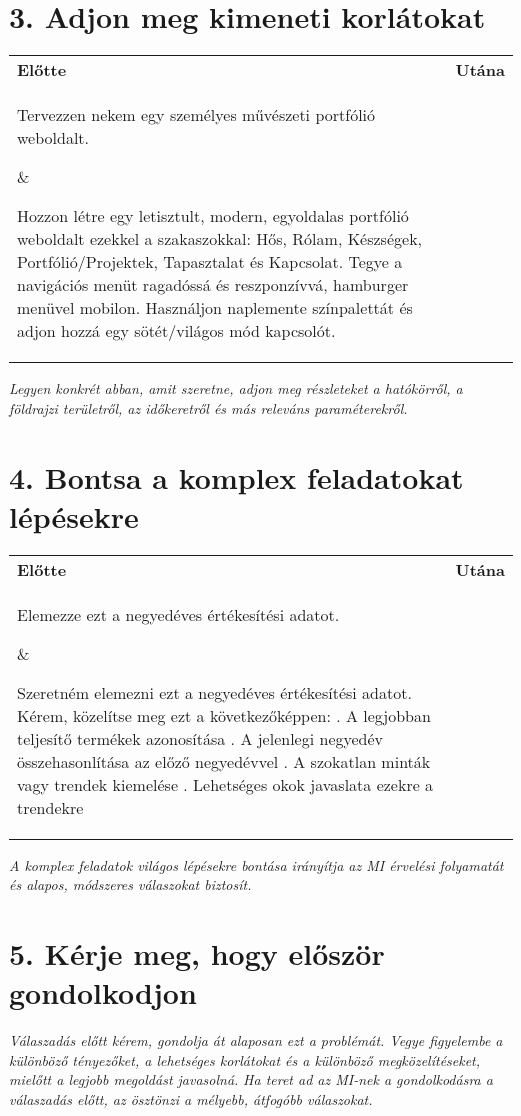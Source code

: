 \documentclass[a4paper, 12pt]{article}
\begin{document}
\section*{3. Adjon meg kimeneti korlátokat}
\begin{tabular}{p{} p{}}
\textbf{Előtte} & \textbf{Utána} \\
\parbox[t]{0.45\textwidth}{Tervezzen nekem egy személyes művészeti portfólió weboldalt.} & \parbox[t]{0.45\textwidth}{Hozzon létre egy letisztult, modern, egyoldalas portfólió weboldalt ezekkel a szakaszokkal: Hős, Rólam, Készségek, Portfólió/Projektek, Tapasztalat és Kapcsolat. Tegye a navigációs menüt ragadóssá és reszponzívvá, hamburger menüvel mobilon. Használjon naplemente színpalettát és adjon hozzá egy sötét/világos mód kapcsolót.} \\
\end{tabular}
\textit{Legyen konkrét abban, amit szeretne, adjon meg részleteket a hatókörről, a földrajzi területről, az időkeretről és más releváns paraméterekről.}

\section*{4. Bontsa a komplex feladatokat lépésekre}
\begin{tabular}{p{} p{}}
\textbf{Előtte} & \textbf{Utána} \\
\parbox[t]{0.45\textwidth}{Elemezze ezt a negyedéves értékesítési adatot.} & \parbox[t]{0.45\textwidth}{Szeretném elemezni ezt a negyedéves értékesítési adatot. Kérem, közelítse meg ezt a következőképpen: . A legjobban teljesítő termékek azonosítása . A jelenlegi negyedév összehasonlítása az előző negyedévvel . A szokatlan minták vagy trendek kiemelése . Lehetséges okok javaslata ezekre a trendekre} \\
\end{tabular}
\textit{A komplex feladatok világos lépésekre bontása irányítja az MI érvelési folyamatát és alapos, módszeres válaszokat biztosít.}

\section*{5. Kérje meg, hogy először gondolkodjon}
\textit{Válaszadás előtt kérem, gondolja át alaposan ezt a problémát. Vegye figyelembe a különböző tényezőket, a lehetséges korlátokat és a különböző megközelítéseket, mielőtt a legjobb megoldást javasolná.}
\textit{Ha teret ad az MI-nek a gondolkodásra a válaszadás előtt, az ösztönzi a mélyebb, átfogóbb válaszokat.}
\end{document}
